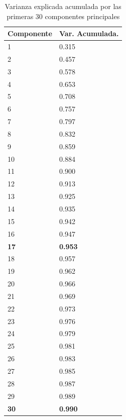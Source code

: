 \documentclass[journal]{IEEEtran}
\begin{document}
\begin{table}[ht!]
\label{table:pca_results}
\caption{Varianza explicada acumulada por las primeras 30 componentes principales}
\centering
\begin{tabular}{l | l }
Componente & Var. Acumulada.  \\
\hline
 1  &  0.315 \\
 2  &  0.457  \\
 3  &  0.578  \\
 4  &  0.653  \\
 5  &  0.708  \\
 6  &  0.757  \\
 7  &  0.797  \\
 8  &  0.832  \\
 9  &  0.859  \\
10  &  0.884  \\
11  &  0.900 \\
12  &  0.913  \\
13  &  0.925 \\
14  &  0.935  \\
15  &  0.942  \\
16  &  0.947  \\
\textbf{17}  &  \textbf{0.953}  \\
18  &  0.957 \\
19  &  0.962  \\
20  &  0.966  \\
21  &  0.969  \\
22  &  0.973  \\
23  &  0.976  \\
24  &  0.979  \\
25  &  0.981  \\
26  &  0.983  \\
27  &  0.985  \\
28  &  0.987  \\
29  &  0.989  \\
\textbf{30}  &  \textbf{0.990}  \\
\end{tabular}
\end{table}
\end{document}
